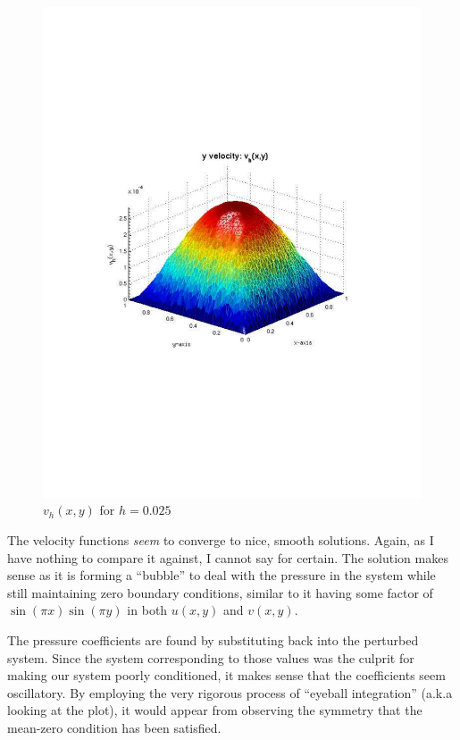 \documentclass[12pt]{article}
\begin{document}
                \begin{figure}[htb]
                    \begin{center}
                \includegraphics[scale=0.50]{./../files/box/3v.pdf}
                \caption{$v_h(x,y)$ for $h = 0.025$}
            \end{center}
            \end{figure}


            The velocity functions \textit{seem} to converge to nice, smooth solutions. Again, as I have nothing to compare
            it against, I cannot say for certain. The solution makes sense as it is forming a ``bubble'' to deal with the pressure
            in the system while still maintaining zero boundary conditions, similar to it having some factor of $\sin(\pi x) \sin(\pi y)$ in both
            $u(x,y)$ and $v(x,y)$.

            The pressure coefficients are found by substituting back into the perturbed system. Since the system corresponding to those values was the
            culprit for making our system poorly conditioned, it makes sense that the coefficients seem oscillatory. By employing the very rigorous process of
            ``eyeball integration'' (a.k.a looking at the plot), it would appear from observing the symmetry that the mean-zero condition has been satisfied.
\end{document}

